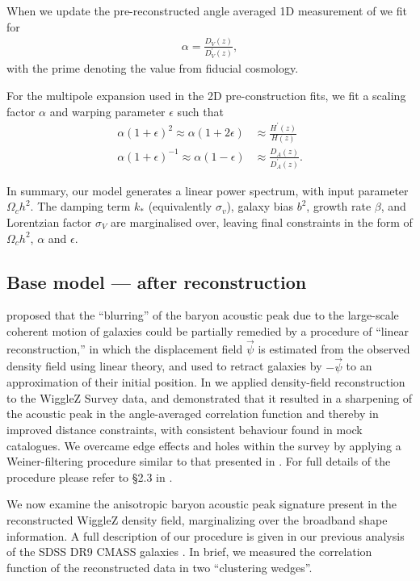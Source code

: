 \documentclass[a4paper,fleqn,usenatbib]{mnras}
\begin{document}
When we update the pre-reconstructed angle averaged 1D measurement of \citet{BlakeKazin2011} we fit for 
\begin{align}
\alpha = \frac{D_V(z)}{D_V^{\prime}(z) },\label{eq:DvDv}
\end{align}
with the prime denoting the value from fiducial cosmology.

For the multipole expansion used in the 2D pre-construction fits, we fit a scaling factor $\alpha$ and warping parameter $\epsilon$ such that
\begin{align}
\alpha(1 + \epsilon)^2 \approx \alpha(1 + 2\epsilon) &\approx \frac{H^\prime(z)}{H(z)} \label{eq:alpha1}\\
\alpha(1 + \epsilon)^{-1} \approx \alpha(1 - \epsilon) &\approx \frac{D_A(z)}{D_A^\prime(z) }. \label{eq:alpha2}
\end{align}


In summary, our model generates a linear power spectrum, with input parameter $\Omega_c h^2$. The damping term $k_*$ (equivalently $\sigma_v$), galaxy bias $b^2$, growth rate $\beta$, and Lorentzian factor $\sigma_V$ are marginalised over, leaving final constraints in the form of $\Omega_c h^2$, $\alpha$ and $\epsilon$. 

\subsection{Base model --- after reconstruction}

\citet{EisensteinSeoSirko2007} proposed that the ``blurring'' of the baryon
acoustic peak due to the large-scale coherent motion of galaxies could
be partially remedied by a procedure of ``linear reconstruction,'' in
which the displacement field $\vec{\psi}$ is estimated from the
observed density field using linear theory, and used to retract
galaxies by $-\vec{\psi}$ to an approximation of their initial
position.  In \citet{KazinKoda2014} we applied density-field
reconstruction to the WiggleZ Survey data, and demonstrated that it
resulted in a sharpening of the acoustic peak in the angle-averaged
correlation function and thereby in improved distance constraints,
with consistent behaviour found in mock catalogues.  We overcame edge
effects and holes within the survey by applying a Weiner-filtering
procedure similar to that presented in \citet{PadmanabhanXuEisenstein2012}.  For
full details of the procedure please refer to \S 2.3 in
\cite{KazinKoda2014}.

We now examine the anisotropic baryon acoustic peak signature present
in the reconstructed WiggleZ density field, marginalizing over the
broadband shape information.  A full description of our procedure is
given in our previous analysis of the SDSS DR9 CMASS galaxies
\citet[][see \S 5.3]{KazinSanchezCuesta2013}.  In brief, we measured the
correlation function of the reconstructed data in two ``clustering
wedges''. 
\end{document}
